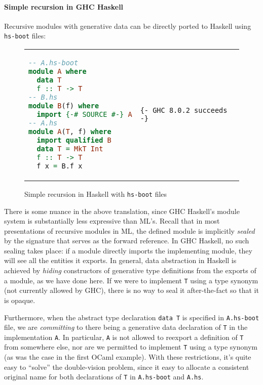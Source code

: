 \paragraph{Simple recursion in GHC Haskell} Recursive modules
with generative data can be directly ported to Haskell using \verb|hs-boot| files:

\begin{figure}[H]
\begin{tabular}{p{} p{}}
\begin{lstlisting}[language=Haskell,escapechar=@]
-- A.hs-boot
module A where
  data T
  f :: T -> T
-- B.hs
module B(f) where
  import {-# SOURCE #-} A
-- A.hs
module A(T, f) where
  import qualified B
  data T = MkT Int
  f :: T -> T
  f x = B.f x
\end{lstlisting}
&
\begin{verbatim}
{- GHC 8.0.2 succeeds -}
\end{verbatim}
\end{tabular}
\caption{Simple recursion in Haskell with \texttt{hs-boot} files}
\label{fig:double-vision-simple-recursion-haskell-hs-boot}
\end{figure}

\noindent
There is some nuance in the above translation, since GHC Haskell's module
system is substantially less expressive than ML's.  Recall that in most
presentations of recursive modules in ML, the defined module is implicitly
\emph{sealed} by the signature that serves as the forward reference.
In GHC Haskell, no such sealing takes place: if a module directly
imports the implementing module, they will see all the entities it
exports.  In general, data abstraction in Haskell is achieved by \emph{hiding}
constructors of generative type definitions from the exports of a module, as we
have done here. If we were to implement \verb|T| using a type synonym
(not currently allowed by GHC), there is no way to seal it after-the-fact
so that it is opaque.

Furthermore, when the abstract type declaration \verb|data T| is specified in
\verb|A.hs-boot| file, we are \emph{committing} to there being a
generative data declaration of \verb|T| in the implementation \verb|A|.
In particular, \verb|A| is not allowed to reexport a definition of
\verb|T| from somewhere else, nor are we permitted to implement \verb|T|
using a type synonym (as was the case in the first OCaml example).
With these restrictions, it's quite easy to ``solve'' the double-vision
problem, since it easy to allocate a consistent original name for both
declarations of \verb|T| in \verb|A.hs-boot| and \verb|A.hs|.

